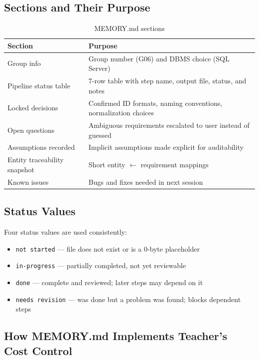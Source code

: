 \documentclass[12pt,a4paper]{article}
\begin{document}
\subsection{Sections and Their Purpose}

\begin{table}[h]
\centering
\begin{tabular}{|l|p{7cm}|}
\hline
\textbf{Section} & \textbf{Purpose} \\
\hline
Group info & Group number (G06) and DBMS choice (SQL Server) \\
\hline
Pipeline status table & 7-row table with step name, output file, status, and notes \\
\hline
Locked decisions & Confirmed ID formats, naming conventions, normalization choices \\
\hline
Open questions & Ambiguous requirements escalated to user instead of guessed \\
\hline
Assumptions recorded & Implicit assumptions made explicit for auditability \\
\hline
Entity traceability snapshot & Short entity $\leftarrow$ requirement mappings \\
\hline
Known issues & Bugs and fixes needed in next session \\
\hline
\end{tabular}
\caption{MEMORY.md sections}
\end{table}

\subsection{Status Values}

Four status values are used consistently:
\begin{itemize}[nosep]
    \item \texttt{not started} --- file does not exist or is a 0-byte placeholder
    \item \texttt{in-progress} --- partially completed, not yet reviewable
    \item \texttt{done} --- complete and reviewed; later steps may depend on it
    \item \texttt{needs revision} --- was done but a problem was found; blocks dependent steps
\end{itemize}

\subsection{How MEMORY.md Implements Teacher's Cost Control}
\end{document}

